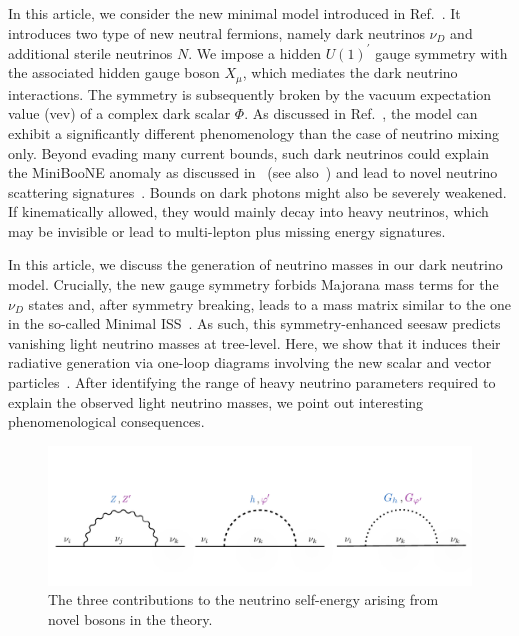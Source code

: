 In this article, we consider the new minimal model introduced in Ref.~\cite{Ballett:2019pyw}.
It introduces two type of new neutral fermions, namely dark neutrinos $\nu_D$ and additional sterile neutrinos $N$. We impose a hidden $U(1)^\prime$ gauge symmetry with the associated hidden gauge boson $X_\mu$, which mediates the dark neutrino interactions. The symmetry is subsequently broken by the vacuum expectation value (vev) of a complex dark scalar $\Phi$. As discussed in Ref.~\cite{Ballett:2019pyw}, the model can exhibit a significantly different phenomenology than the case of neutrino mixing only. Beyond evading many current bounds, such dark neutrinos could explain the MiniBooNE anomaly as discussed in~\cite{Ballett:2018ynz} (see also~\cite{Bertuzzo:2018itn}) and lead to novel neutrino scattering signatures~\cite{Arguelles:2018mtc}. Bounds on dark photons might also be severely weakened. If kinematically allowed, they would mainly decay into heavy neutrinos, which may be invisible or lead to multi-lepton plus missing energy signatures. 

In this article, we discuss the generation of neutrino masses in our dark neutrino model.
Crucially, the new gauge symmetry forbids Majorana mass terms for the $\nu_D$ states and, after symmetry breaking, leads to a mass matrix similar to the one in the so-called Minimal ISS~\cite{Dev:2012sg}. As such, this symmetry-enhanced seesaw predicts vanishing light neutrino masses at tree-level. Here, we show that it induces their radiative generation via one-loop diagrams involving the new scalar and vector particles~\cite{Dev:2012sg,Zhang:2013ama,Diaz:2017edh}. After identifying the range of heavy neutrino parameters required to explain the observed light neutrino masses, we point out interesting phenomenological consequences.

\begin{figure}[t]
\centering\includegraphics[width=\textwidth]{dark_nus/Loop_masses.pdf}
\caption[]{\label{fig:loops}The three contributions to the neutrino self-energy arising from novel bosons in the theory.}
\end{figure}

